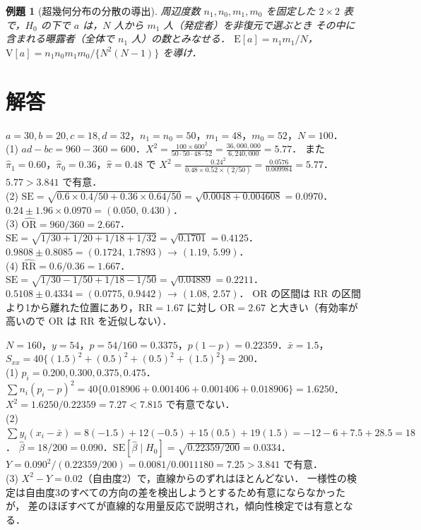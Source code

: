\documentclass[a4paper,11pt,openany]{ltjsbook}
\newtheorem{reidai}{例題}[chapter]
\newenvironment{kaitou}[1]{%
  \par\medskip\noindent
  \begin{tcolorbox}[enhanced,breakable,colback=bkgray!3,colframe=bkgray!60,boxrule=0.4pt,
    left=4pt,right=4pt,top=2pt,bottom=2pt,arc=1pt,
    title={\cref{#1}の解答},fonttitle=\bfseries\small,coltitle=white,colbacktitle=bkgray!80]}%
  {\end{tcolorbox}\par}
\newcommand{\E}{\mathrm{E}}
\newcommand{\V}{\mathrm{V}}
\newcommand{\SE}{\mathrm{SE}}
\newcommand{\RR}{\mathrm{RR}}
\newcommand{\OR}{\mathrm{OR}}
\begin{document}
\begin{reidai}[超幾何分布の分散の導出]\label{reidai:04-4}
周辺度数 $n_1,n_0,m_1,m_0$ を固定した $2\times2$ 表で，$H_0$ の下で $a$ は，$N$ 人から $m_1$ 人（発症者）を非復元で選ぶとき
その中に含まれる曝露者（全体で $n_1$ 人）の数とみなせる．
$\E[a]=n_1m_1/N$，$\V[a]=n_1n_0m_1m_0/\{N^2(N-1)\}$ を導け．
\end{reidai}

\section{解答}\label{sec:04-sol}
\begin{kaitou}{reidai:04-1}
$a=30,b=20,c=18,d=32$，$n_1=n_0=50$，$m_1=48$，$m_0=52$，$N=100$．\\
(1) $ad-bc=960-360=600$．$X^2=\frac{100\times600^2}{50\cdot50\cdot48\cdot52}=\frac{36{,}000{,}000}{6{,}240{,}000}=5.77$．
また $\hat\pi_1=0.60$，$\hat\pi_0=0.36$，$\hat\pi=0.48$ で
$X^2=\frac{0.24^2}{0.48\times0.52\times(2/50)}=\frac{0.0576}{0.009984}=5.77$．$5.77>3.841$ で有意．\\
(2) $\SE=\sqrt{0.6\times0.4/50+0.36\times0.64/50}=\sqrt{0.0048+0.004608}=0.0970$．
$0.24\pm1.96\times0.0970=(0.050,\,0.430)$．\\
(3) $\widehat{\OR}=960/360=2.667$．$\SE=\sqrt{1/30+1/20+1/18+1/32}=\sqrt{0.1701}=0.4125$．
$0.9808\pm0.8085=(0.1724,\,1.7893)$ → $(1.19,\,5.99)$．\\
(4) $\widehat{\RR}=0.6/0.36=1.667$．$\SE=\sqrt{1/30-1/50+1/18-1/50}=\sqrt{0.04889}=0.2211$．
$0.5108\pm0.4334=(0.0775,\,0.9442)$ → $(1.08,\,2.57)$．
OR の区間は RR の区間より1から離れた位置にあり，$\RR=1.67$ に対し $\OR=2.67$ と大きい（有効率が高いので OR は RR を近似しない）．
\end{kaitou}

\begin{kaitou}{reidai:04-2}
$N=160$，$y=54$，$p=54/160=0.3375$，$p(1-p)=0.22359$．$\bar x=1.5$，$S_{xx}=40\{(1.5)^2+(0.5)^2+(0.5)^2+(1.5)^2\}=200$．\\
(1) $p_i=0.200,0.300,0.375,0.475$．$\sum n_i(p_i-p)^2=40\{0.018906+0.001406+0.001406+0.018906\}=1.6250$．
$X^2=1.6250/0.22359=7.27<7.815$ で有意でない．\\
(2) $\sum y_i(x_i-\bar x)=8(-1.5)+12(-0.5)+15(0.5)+19(1.5)=-12-6+7.5+28.5=18$．
$\hat\beta=18/200=0.090$．$\SE[\hat\beta\mid H_0]=\sqrt{0.22359/200}=0.0334$．
$Y=0.090^2/(0.22359/200)=0.0081/0.0011180=7.25>3.841$ で有意．\\
(3) $X^2-Y=0.02$（自由度2）で，直線からのずれはほとんどない．
一様性の検定は自由度3のすべての方向の差を検出しようとするため有意にならなかったが，
差のほぼすべてが直線的な用量反応で説明され，傾向性検定では有意となる．
\end{kaitou}
\end{document}
